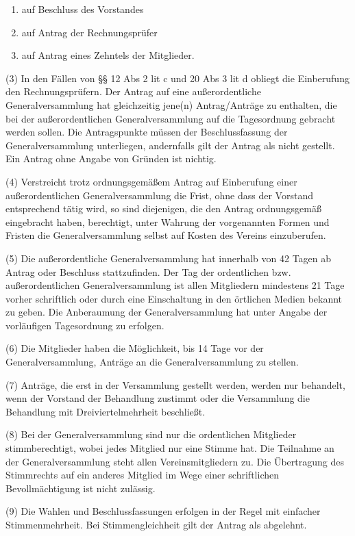 \documentclass[10pt,a4paper]{article}
\begin{document}
\begin{enumerate}[label=\alph*)]
\item
auf Beschluss des Vorstandes
\item
auf Antrag der Rechnungsprüfer
\item
auf Antrag eines Zehntels der Mitglieder.
\end{enumerate}

(3)
In den Fällen von §§ 12 Abs 2 lit c und 20 Abs 3 lit d obliegt die Einberufung den Rechnungsprüfern.
Der Antrag auf eine außerordentliche Generalversammlung hat gleichzeitig jene(n) Antrag/Anträge zu enthalten, die bei der außerordentlichen Generalversammlung auf die Tagesordnung gebracht werden sollen.
Die Antragspunkte müssen der Beschlussfassung der Generalversammlung unterliegen, andernfalls gilt der Antrag als nicht gestellt.
Ein Antrag ohne Angabe von Gründen ist nichtig.

(4)
Verstreicht trotz ordnungsgemäßem Antrag auf Einberufung einer außerordentlichen Generalversammlung die Frist, ohne dass der Vorstand entsprechend tätig wird, so sind diejenigen, die den Antrag ordnungsgemäß eingebracht haben, berechtigt, unter Wahrung der vorgenannten Formen und Fristen die Generalversammlung selbst auf Kosten des Vereins einzuberufen.

(5)
Die außerordentliche Generalversammlung hat innerhalb von 42 Tagen ab Antrag oder Beschluss stattzufinden.
Der Tag der ordentlichen bzw. außerordentlichen Generalversammlung ist allen Mitgliedern mindestens 21 Tage vorher schriftlich oder durch eine Einschaltung in den örtlichen Medien bekannt zu geben.
Die Anberaumung der Generalversammlung hat unter Angabe der vorläufigen Tagesordnung zu erfolgen.

(6)
Die Mitglieder haben die Möglichkeit, bis 14 Tage vor der Generalversammlung, Anträge an die Generalversammlung zu stellen.

(7)
Anträge, die erst in der Versammlung gestellt werden, werden nur behandelt, wenn der Vorstand der Behandlung zustimmt oder die Versammlung die Behandlung mit Dreiviertelmehrheit beschließt.

(8)
Bei der Generalversammlung sind nur die ordentlichen Mitglieder stimmberechtigt, wobei jedes Mitglied nur eine Stimme hat.
Die Teilnahme an der Generalversammlung steht allen Vereinsmitgliedern zu.
Die Übertragung des Stimmrechts auf ein anderes Mitglied im Wege einer schriftlichen Bevollmächtigung ist nicht zulässig.

(9)
Die Wahlen und Beschlussfassungen erfolgen in der Regel mit einfacher Stimmenmehrheit.
Bei Stimmengleichheit gilt der Antrag als abgelehnt.
\end{document}
